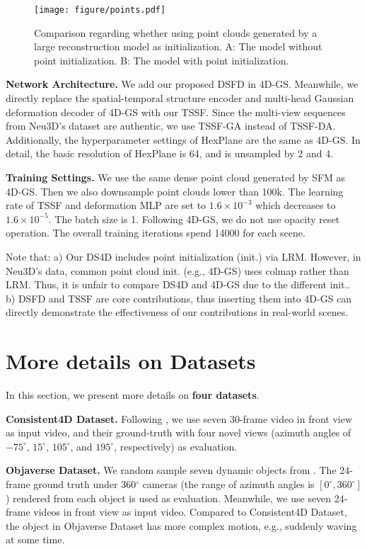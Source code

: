 \begin{figure}[h]%
\centering
\texttt{[image: figure/points.pdf]}
\caption{Comparison regarding whether using point clouds generated by a large reconstruction model as initialization. A: The model without point initialization. B: The model with point initialization.}\label{points}
\end{figure}

\textbf{Network Architecture.} We add our proposed DSFD in 4D-GS. Meanwhile, we directly replace the spatial-temporal structure encoder and multi-head Gaussian deformation decoder of 4D-GS with our TSSF. Since the multi-view sequences from Neu3D's dataset are authentic, we use TSSF-GA instead of TSSF-DA. Additionally, the hyperparameter settings of HexPlane are the same as 4D-GS. In detail, the basic resolution of HexPlane is 64, and is unsampled by 2 and 4. 



\textbf{Training Settings.} We use the same dense point cloud generated by SFM as 4D-GS. Then we also downsample point clouds lower than 100k. The learning rate of TSSF and deformation MLP are set to $1.6\times 10^{-3}$ which decreases to $1.6\times 10^{-5}$. The batch size is 1. Following 4D-GS, we do not use opacity reset operation. The overall training iterations spend 14000 for each scene.


Note that: a) Our DS4D includes point initialization (init.) via LRM. However, in Neu3D's data, common point cloud init. (e.g., 4D-GS) uses colmap rather than LRM. Thus, it is unfair to compare DS4D and 4D-GS due to the different init.. b) DSFD and TSSF are core contributions, thus inserting them into 4D-GS can directly demonstrate the effectiveness of our contributions in real-world scenes.



\section{More details on Datasets}
In this section, we present more details on \textbf{four datasets}.

\textbf{Consistent4D Dataset.} Following \cite{zeng2024stag4d}, we use seven 30-frame video in front view as input video, and their ground-truth with four novel views (azimuth angles of $-75^{\circ}$, $15^{\circ}$, $105^{\circ}$, and $195^{\circ}$, respectively) as evaluation. 

\textbf{Objaverse Dataset.} We random sample seven dynamic objects from \cite{deitke2023objaverse,liang2024diffusion4d}. The 24-frame ground truth under 360$^\circ$ cameras (the range of azimuth angles is $[0^{\circ}, 360^{\circ}]$) rendered from each object is used as evaluation. Meanwhile, we use seven 24-frame videos in front view as input video. Compared to Consistent4D Dataset, the object in Objaverse Dataset has more complex motion, e.g., suddenly waving at some time.

